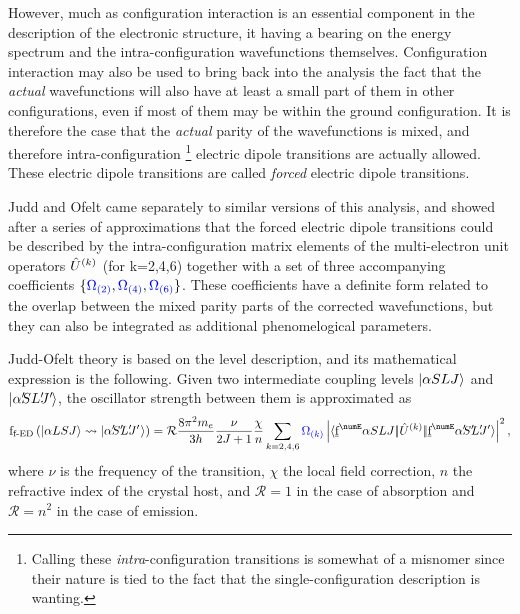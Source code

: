 \documentclass{article}
\begin{document}
However, much as configuration interaction is an essential component in the description of the electronic structure, it having a bearing on the energy spectrum and the intra-configuration wavefunctions themselves. Configuration interaction may also be used to bring back into the analysis the fact that the \textit{actual} wavefunctions will also have at least a small part of them in other configurations, even if most of them may be within the ground configuration. It is therefore the case that the \textit{actual} parity of the wavefunctions is mixed, and therefore intra-configuration \footnote{Calling these \textit{intra}-configuration transitions is somewhat of a misnomer since their nature is tied to the fact that the single-configuration description is wanting.} electric dipole transitions are actually allowed. These electric dipole transitions are called \textit{forced} electric dipole transitions.

Judd \cite{judd_optical_1962} and Ofelt \cite{ofelt_intensities_1962} came separately to similar versions of this analysis, and showed after a series of approximations that the forced electric dipole transitions could be described by the intra-configuration matrix elements of the multi-electron unit operators $\hat{U}^{(k)}$ (for k=2,4,6) together with a set of three accompanying coefficients $\{\textcolor{blue}{\Omega_{(2)}},\textcolor{blue}{\Omega_{(4)}},\textcolor{blue}{\Omega_{(6)}}\}$. These coefficients have a definite form related to the overlap between the mixed parity parts of the corrected wavefunctions, but they can also be integrated as additional phenomelogical parameters.

Judd-Ofelt theory is based on the level description, and its mathematical expression is the following. Given two intermediate coupling levels $|\alpha SLJ\rangle$ and $\ket{\alpha\mathrlap{'} SL\mathrlap{'}J\mathrlap{'}\,}$, the oscillator strength between them is approximated as \cite{judd_optical_1962} 
\begin{equation}
\oStrength{f-ED}{\alpha{LSJ}}{\alpha\mathrlap{'} S\mathrlap{'} L\mathrlap{'} J\mathrlap{'}\,\,} = 
	\mathcal{R} \frac{8 \pi^2 m_e}{3 h}
	\frac{\nu}{\tpo{J}}
	\frac{\chi}{n} 
	\sum_{k=2,4,6}
		\JOk{k} 
		\left|
			\redbraopket{\forb^\numE \alpha SLJ}
				{\op{U}^{(k)}}
				{\forb^\numE \alpha\mathrlap{'} S\mathrlap{'} L\mathrlap{'} J'} 
		\right|^2,
\label{eqn:forced-dipole-judd-ofelt}
\end{equation}
where $\nu$ is the frequency of the transition, $\chi$ the local field correction, $n$ the refractive index of the crystal host, and $\mathcal{R} = 1$ in the case of absorption and $\mathcal{R} = n^2$ in the case of emission. 
\end{document}
